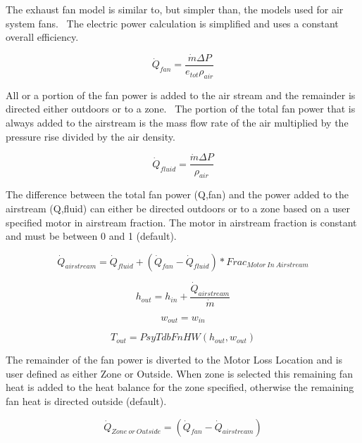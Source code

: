 The exhaust fan model is similar to, but simpler than, the models used for air system fans.~ The electric power calculation is simplified and uses a constant overall efficiency.

\begin{equation}
{\dot Q_{fan}} = \frac{\dot m \Delta P}{e_{tot} \rho_{air}}
\end{equation}

All or a portion of the fan power is added to the air stream and the remainder is directed either outdoors or to a zone.~ The portion of the total fan power that is always added to the airstream is the mass flow rate of the air multiplied by the pressure rise divided by the air density.

\begin{equation}
{\dot Q_{fluid}} = \frac{\dot m \Delta P}{\rho_{air}}
\end{equation}

The difference between the total fan power (Q,fan) and the power added to the airstream (Q,fluid) can either be directed outdoors or to a zone based on a user specified motor in airstream fraction. The motor in airstream fraction is constant and must be between 0 and 1 (default).

\begin{equation}
{\dot Q_{airstream}} = \dot Q_{fluid} + ({\dot Q_{fan} - \dot Q_{fluid}}) * Frac_{Motor\ In\ Airstream}
\end{equation}

\begin{equation}
{h_{out}} = {h_{in}} + \frac{{{{\dot Q}_{airstream}}}}{{\dot m}}
\end{equation}

\begin{equation}
{w_{out}} = {w_{in}}
\end{equation}

\begin{equation}
{T_{out}} = PsyTdbFnHW\left( {{h_{out}},{w_{out}}} \right)
\end{equation}

The remainder of the fan power is diverted to the Motor Loss Location and is user defined as either Zone or Outside. When zone is selected this remaining fan heat is added to the heat balance for the zone specified, otherwise the remaining fan heat is directed outside (default).

\begin{equation}
{\dot Q_{Zone\ or\ Outside}} = \left( \dot Q_{fan} - \dot Q_{airstream} \right)
\end{equation}

